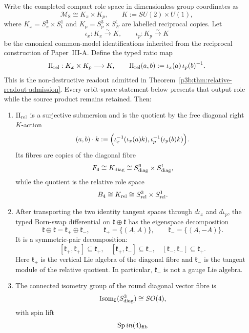 \documentclass[12pt,a4paper]{article}
\begin{document}
\begin{theorem}
\label{p3:thm:born-parity-decomposition}
Write the completed compact role space in dimensionless group coordinates as
\[
        \mathcal M_8\cong K_x\times K_p,
        \qquad
        K:=SU(2)\times U(1),
\]
where \(K_x=S^3_x\times S^1_t\) and
\(K_p=S^3_p\times S^1_E\) are labelled reciprocal copies.  Let
\[
 \iota_x:K_x\xrightarrow{\sim}K,
 \qquad
 \iota_p:K_p\xrightarrow{\sim}K
\]
be the canonical common-model identifications inherited from the reciprocal
construction of Paper~III-A.  Define the typed ratio map
\[
        \Pi_{\rm rel}:K_x\times K_p\longrightarrow K,
        \qquad
        \Pi_{\rm rel}(a,b):=\iota_x(a)\,\iota_p(b)^{-1}.
\]
This is the non-destructive readout admitted in
Theorem~\ref{p3b:thm:relative-readout-admission}.  Every orbit-space statement
below presents that output role while the source product remains retained.
Then:
\begin{enumerate}[label=(\roman*),leftmargin=2.2em]
\item \(\Pi_{\rm rel}\) is a surjective submersion and is the quotient by the
      free diagonal right \(K\)-action
\[
 (a,b)\cdot k
 :=\Bigl(\iota_x^{-1}(\iota_x(a)k),
          \iota_p^{-1}(\iota_p(b)k)\Bigr).
\]
Its fibres are copies of the diagonal fibre
\[
        F_4\cong K_{\rm diag}
        \cong S^3_{\rm diag}\times S^1_{\rm diag},
\]
while the quotient is the relative role space
\[
        B_4\cong K_{\rm rel}
        \cong S^3_{\rm rel}\times S^1_{\rm rel}.
\]
\item After transporting the two identity tangent spaces through
\(d\iota_x\) and \(d\iota_p\), the typed Born-swap differential on
\(\mathfrak k\oplus\mathfrak k\) has the eigenspace decomposition
\[
\mathfrak k\oplus\mathfrak k
 =\mathfrak k_+\oplus\mathfrak k_-,
\qquad
\mathfrak k_+=\{(A,A)\},
\qquad
\mathfrak k_-=\{(A,-A)\}.
\]
It is a symmetric-pair decomposition:
\[
[\mathfrak k_+,\mathfrak k_+]\subseteq\mathfrak k_+,
\quad
[\mathfrak k_+,\mathfrak k_-]\subseteq\mathfrak k_-,
\quad
[\mathfrak k_-,\mathfrak k_-]\subseteq\mathfrak k_+.
\]
Here \(\mathfrak k_+\) is the vertical Lie algebra of the diagonal fibre and
\(\mathfrak k_-\) is the tangent module of the relative quotient.  In
particular, \(\mathfrak k_-\) is not a gauge Lie algebra.
\item The connected isometry group of the round diagonal vector fibre is
\[
        \operatorname{Isom}_0(S^3_{\rm diag})\cong SO(4),
\]
with spin lift
\[
        \operatorname{Sp}in(4)_{\rm fib}
\]
\end{enumerate}
\end{theorem}
\end{document}
